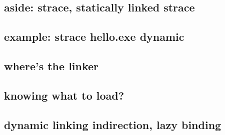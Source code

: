
\subsection{aside: strace, statically linked strace}



\subsection{example: strace hello.exe dynamic}



\subsection{where's the linker}



\subsection{knowing what to load?}



\subsection{dynamic linking indirection, lazy binding}





